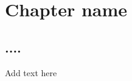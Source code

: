 \clearpage
\thispagestyle{empty}
~\clearpage
\chapter{Chapter name}
\label{chap6}
\section{....}
Add text here

\clearpage 
